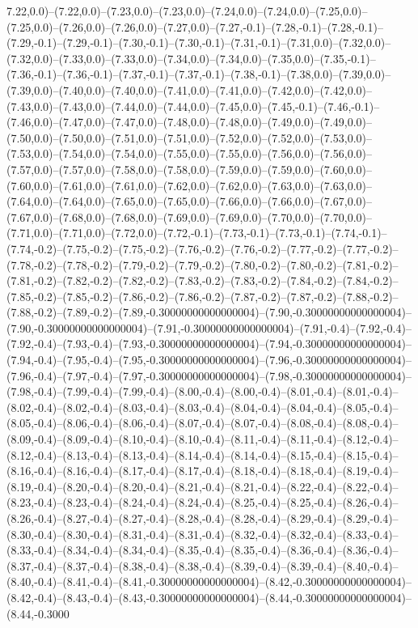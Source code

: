 7.22,0.0)--(7.22,0.0)--(7.23,0.0)--(7.23,0.0)--(7.24,0.0)--(7.24,0.0)--(7.25,0.0)--(7.25,0.0)--(7.26,0.0)--(7.26,0.0)--(7.27,0.0)--(7.27,-0.1)--(7.28,-0.1)--(7.28,-0.1)--(7.29,-0.1)--(7.29,-0.1)--(7.30,-0.1)--(7.30,-0.1)--(7.31,-0.1)--(7.31,0.0)--(7.32,0.0)--(7.32,0.0)--(7.33,0.0)--(7.33,0.0)--(7.34,0.0)--(7.34,0.0)--(7.35,0.0)--(7.35,-0.1)--(7.36,-0.1)--(7.36,-0.1)--(7.37,-0.1)--(7.37,-0.1)--(7.38,-0.1)--(7.38,0.0)--(7.39,0.0)--(7.39,0.0)--(7.40,0.0)--(7.40,0.0)--(7.41,0.0)--(7.41,0.0)--(7.42,0.0)--(7.42,0.0)--(7.43,0.0)--(7.43,0.0)--(7.44,0.0)--(7.44,0.0)--(7.45,0.0)--(7.45,-0.1)--(7.46,-0.1)--(7.46,0.0)--(7.47,0.0)--(7.47,0.0)--(7.48,0.0)--(7.48,0.0)--(7.49,0.0)--(7.49,0.0)--(7.50,0.0)--(7.50,0.0)--(7.51,0.0)--(7.51,0.0)--(7.52,0.0)--(7.52,0.0)--(7.53,0.0)--(7.53,0.0)--(7.54,0.0)--(7.54,0.0)--(7.55,0.0)--(7.55,0.0)--(7.56,0.0)--(7.56,0.0)--(7.57,0.0)--(7.57,0.0)--(7.58,0.0)--(7.58,0.0)--(7.59,0.0)--(7.59,0.0)--(7.60,0.0)--(7.60,0.0)--(7.61,0.0)--(7.61,0.0)--(7.62,0.0)--(7.62,0.0)--(7.63,0.0)--(7.63,0.0)--(7.64,0.0)--(7.64,0.0)--(7.65,0.0)--(7.65,0.0)--(7.66,0.0)--(7.66,0.0)--(7.67,0.0)--(7.67,0.0)--(7.68,0.0)--(7.68,0.0)--(7.69,0.0)--(7.69,0.0)--(7.70,0.0)--(7.70,0.0)--(7.71,0.0)--(7.71,0.0)--(7.72,0.0)--(7.72,-0.1)--(7.73,-0.1)--(7.73,-0.1)--(7.74,-0.1)--(7.74,-0.2)--(7.75,-0.2)--(7.75,-0.2)--(7.76,-0.2)--(7.76,-0.2)--(7.77,-0.2)--(7.77,-0.2)--(7.78,-0.2)--(7.78,-0.2)--(7.79,-0.2)--(7.79,-0.2)--(7.80,-0.2)--(7.80,-0.2)--(7.81,-0.2)--(7.81,-0.2)--(7.82,-0.2)--(7.82,-0.2)--(7.83,-0.2)--(7.83,-0.2)--(7.84,-0.2)--(7.84,-0.2)--(7.85,-0.2)--(7.85,-0.2)--(7.86,-0.2)--(7.86,-0.2)--(7.87,-0.2)--(7.87,-0.2)--(7.88,-0.2)--(7.88,-0.2)--(7.89,-0.2)--(7.89,-0.30000000000000004)--(7.90,-0.30000000000000004)--(7.90,-0.30000000000000004)--(7.91,-0.30000000000000004)--(7.91,-0.4)--(7.92,-0.4)--(7.92,-0.4)--(7.93,-0.4)--(7.93,-0.30000000000000004)--(7.94,-0.30000000000000004)--(7.94,-0.4)--(7.95,-0.4)--(7.95,-0.30000000000000004)--(7.96,-0.30000000000000004)--(7.96,-0.4)--(7.97,-0.4)--(7.97,-0.30000000000000004)--(7.98,-0.30000000000000004)--(7.98,-0.4)--(7.99,-0.4)--(7.99,-0.4)--(8.00,-0.4)--(8.00,-0.4)--(8.01,-0.4)--(8.01,-0.4)--(8.02,-0.4)--(8.02,-0.4)--(8.03,-0.4)--(8.03,-0.4)--(8.04,-0.4)--(8.04,-0.4)--(8.05,-0.4)--(8.05,-0.4)--(8.06,-0.4)--(8.06,-0.4)--(8.07,-0.4)--(8.07,-0.4)--(8.08,-0.4)--(8.08,-0.4)--(8.09,-0.4)--(8.09,-0.4)--(8.10,-0.4)--(8.10,-0.4)--(8.11,-0.4)--(8.11,-0.4)--(8.12,-0.4)--(8.12,-0.4)--(8.13,-0.4)--(8.13,-0.4)--(8.14,-0.4)--(8.14,-0.4)--(8.15,-0.4)--(8.15,-0.4)--(8.16,-0.4)--(8.16,-0.4)--(8.17,-0.4)--(8.17,-0.4)--(8.18,-0.4)--(8.18,-0.4)--(8.19,-0.4)--(8.19,-0.4)--(8.20,-0.4)--(8.20,-0.4)--(8.21,-0.4)--(8.21,-0.4)--(8.22,-0.4)--(8.22,-0.4)--(8.23,-0.4)--(8.23,-0.4)--(8.24,-0.4)--(8.24,-0.4)--(8.25,-0.4)--(8.25,-0.4)--(8.26,-0.4)--(8.26,-0.4)--(8.27,-0.4)--(8.27,-0.4)--(8.28,-0.4)--(8.28,-0.4)--(8.29,-0.4)--(8.29,-0.4)--(8.30,-0.4)--(8.30,-0.4)--(8.31,-0.4)--(8.31,-0.4)--(8.32,-0.4)--(8.32,-0.4)--(8.33,-0.4)--(8.33,-0.4)--(8.34,-0.4)--(8.34,-0.4)--(8.35,-0.4)--(8.35,-0.4)--(8.36,-0.4)--(8.36,-0.4)--(8.37,-0.4)--(8.37,-0.4)--(8.38,-0.4)--(8.38,-0.4)--(8.39,-0.4)--(8.39,-0.4)--(8.40,-0.4)--(8.40,-0.4)--(8.41,-0.4)--(8.41,-0.30000000000000004)--(8.42,-0.30000000000000004)--(8.42,-0.4)--(8.43,-0.4)--(8.43,-0.30000000000000004)--(8.44,-0.30000000000000004)--(8.44,-0.3000